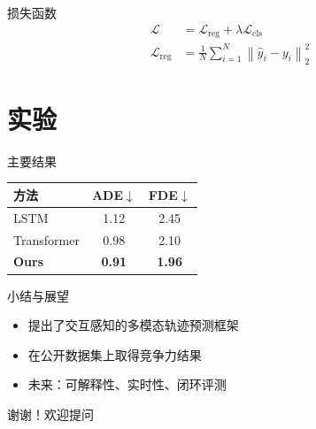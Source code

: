 \documentclass[UTF8,aspectratio=169,10pt]{ctexbeamer}
\begin{document}
\begin{frame}{损失函数}
  \begin{align}
    \mathcal{L}
    &= \mathcal{L}_{\mathrm{reg}} + \lambda \mathcal{L}_{\mathrm{cls}} \\
    \mathcal{L}_{\mathrm{reg}}
    &= \frac{1}{N}\sum_{i=1}^{N}\left\lVert \hat{y}_i - y_i \right\rVert_2^2
  \end{align}
\end{frame}

\section{实验}

\begin{frame}{主要结果}
  \begin{table}
    \centering
    \begin{tabular}{lcc}
      \toprule
      方法 & ADE$\downarrow$ & FDE$\downarrow$ \\
      \midrule
      LSTM & 1.12 & 2.45 \\
      Transformer & 0.98 & 2.10 \\
      \textbf{Ours} & \textbf{0.91} & \textbf{1.96} \\
      \bottomrule
    \end{tabular}
  \end{table}
\end{frame}

\begin{frame}{小结与展望}
  \begin{itemize}
    \item 提出了交互感知的多模态轨迹预测框架
    \item 在公开数据集上取得竞争力结果
    \item 未来：可解释性、实时性、闭环评测
  \end{itemize}
\end{frame}

\begin{frame}[standout]
  谢谢！欢迎提问
\end{frame}
\end{document}
